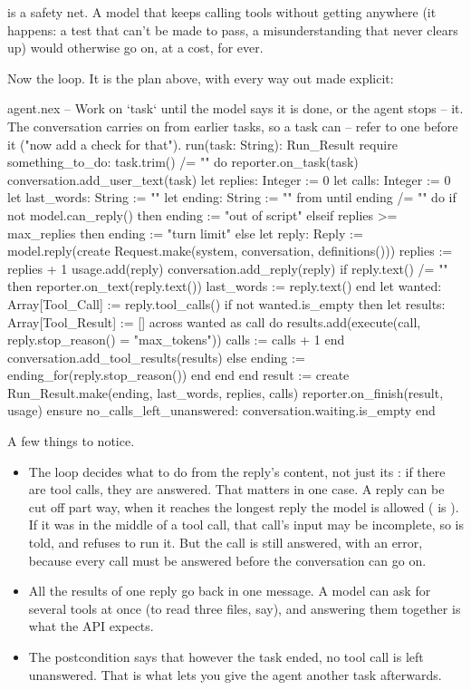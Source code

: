 is a safety net. A model that keeps calling tools
without getting anywhere (it happens: a test that can't be made to pass, a
misunderstanding that never clears up) would otherwise go on, at a cost,
for ever.

Now the loop. It is the plan above, with every way out made explicit:

\begin{continued}{agent.nex}
  -- Work on `task` until the model says it is done, or the agent stops
  -- it. The conversation carries on from earlier tasks, so a task can
  -- refer to one before it ("now add a check for that").
  run(task: String): Run_Result
  require
    something_to_do: task.trim() /= ""
  do
    reporter.on_task(task)
    conversation.add_user_text(task)
    let replies: Integer := 0
    let calls: Integer := 0
    let last_words: String := ""
    let ending: String := ""
    from until ending /= "" do
      if not model.can_reply() then
        ending := "out of script"
      elseif replies >= max_replies then
        ending := "turn limit"
      else
        let reply: Reply := model.reply(create Request.make(system, conversation, definitions()))
        replies := replies + 1
        usage.add(reply)
        conversation.add_reply(reply)
        if reply.text() /= "" then
          reporter.on_text(reply.text())
          last_words := reply.text()
        end
        let wanted: Array[Tool_Call] := reply.tool_calls()
        if not wanted.is_empty then
          let results: Array[Tool_Result] := []
          across wanted as call do
            results.add(execute(call, reply.stop_reason() = "max_tokens"))
            calls := calls + 1
          end
          conversation.add_tool_results(results)
        else
          ending := ending_for(reply.stop_reason())
        end
      end
    end
    result := create Run_Result.make(ending, last_words, replies, calls)
    reporter.on_finish(result, usage)
  ensure
    no_calls_left_unanswered: conversation.waiting.is_empty
  end
\end{continued}

A few things to notice.

\begin{itemize}
\item The loop decides what to do from the reply's content, not just its
  : if there are tool calls, they are answered. That
  matters in one case. A reply can be cut off part way, when it reaches the
  longest reply the model is allowed ( is
  ). If it was in the middle of a tool call, that call's
  input may be incomplete, so  is told, and refuses to run
  it. But the call is still answered, with an error, because every call
  must be answered before the conversation can go on.
\item All the results of one reply go back in one message. A model can ask
  for several tools at once (to read three files, say), and answering them
  together is what the API expects.
\item The postcondition says that however the task ended, no tool call is
  left unanswered. That is what lets you give the agent another task
  afterwards.
\end{itemize}

